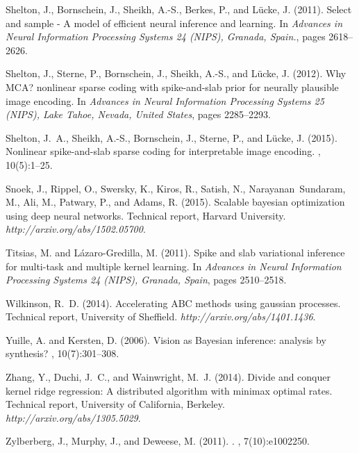 \documentclass[12pt]{article}
\begin{document}
\begin{thebibliography}{}
Shelton, J., Bornschein, J., Sheikh, A.-S., Berkes, P., and L\"ucke, J. (2011).
\newblock Select and sample - {A} model of efficient neural inference and
  learning.
\newblock In {\em Advances in Neural Information Processing Systems 24
  ({NIPS}), Granada, Spain.}, pages 2618--2626.

Shelton, J., Sterne, P., Bornschein, J., Sheikh, A.-S., and L\"ucke, J. (2012).
\newblock Why {MCA}? nonlinear sparse coding with spike-and-slab prior for
  neurally plausible image encoding.
\newblock In {\em Advances in Neural Information Processing Systems 25
  ({NIPS}), Lake Tahoe, Nevada, United States}, pages 2285--2293.

Shelton, J.~A., Sheikh, A.-S., Bornschein, J., Sterne, P., and L\"ucke, J.
  (2015).
\newblock Nonlinear spike-and-slab sparse coding for interpretable image
  encoding.
, 10(5):1--25.

Snoek, J., Rippel, O., Swersky, K., Kiros, R., Satish, N., Narayanan~Sundaram,
  M., Ali, M., Patwary, P., and Adams, R. (2015).
\newblock Scalable bayesian optimization using deep neural networks.
\newblock Technical report, Harvard University.
\newblock \emph{http://arxiv.org/abs/1502.05700}.

Titsias, M. and L{\'a}zaro-Gredilla, M. (2011).
\newblock Spike and slab variational inference for multi-task and multiple
  kernel learning.
\newblock In {\em Advances in Neural Information Processing Systems 24
  ({NIPS}), Granada, Spain}, pages 2510--2518.

Wilkinson, R.~D. (2014).
\newblock Accelerating {ABC} methods using gaussian processes.
\newblock Technical report, University of Sheffield.
\newblock \emph{http://arxiv.org/abs/1401.1436}.

Yuille, A. and Kersten, D. (2006).
\newblock Vision as {Bayesian} inference: analysis by synthesis?
, 10(7):301--308.

Zhang, Y., Duchi, J.~C., and Wainwright, M.~J. (2014).
\newblock Divide and conquer kernel ridge regression: A distributed algorithm
  with minimax optimal rates.
\newblock Technical report, University of California, Berkeley.
\newblock \emph{http://arxiv.org/abs/1305.5029}.

Zylberberg, J., Murphy, J., and Deweese, M. (2011).
.
, 7(10):e1002250.

\end{thebibliography}
\end{document}
